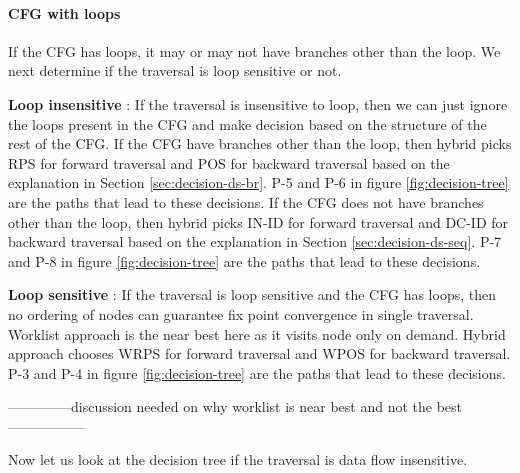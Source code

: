 \paragraph{CFG with loops}
If the CFG has loops, it may or may not have branches other than the loop. We
next determine if the traversal is loop sensitive or not.\par \textbf{Loop
insensitive} : If the traversal is insensitive to loop, then we can just ignore
the loops present in the CFG and make decision based on the structure of the
rest of the CFG. If the CFG have branches other than the loop, then hybrid picks
RPS for forward traversal and POS for backward traversal based on the
explanation in Section \ref{sec:decision-ds-br}. P-5 and P-6 in figure
\ref{fig:decision-tree} are the paths that lead to these decisions. If the CFG
does not have branches other than the loop, then hybrid picks IN-ID for forward
traversal and DC-ID for backward traversal based on the explanation in Section
\ref{sec:decision-ds-seq}. P-7 and P-8 in figure \ref{fig:decision-tree} are the
paths that lead to these decisions.\par \textbf{Loop sensitive} : If the
traversal is loop sensitive and the CFG has loops, then no ordering of nodes can
guarantee fix point convergence in single traversal. Worklist approach is the
near best here as it visits node only on demand. Hybrid approach chooses WRPS
for forward traversal and WPOS for backward traversal. P-3 and P-4 in figure
\ref{fig:decision-tree} are the paths that lead to these decisions.\par
--------------discussion needed on why worklist is near best and not the
best-----------------\par Now let us look at the decision tree if the traversal
is data flow insensitive.
